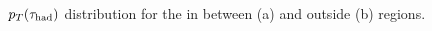 \begin{figure}[ht]
	\centering
	\hfill
	\caption{$p_T(\tau_\text{had})$ distribution for the in between (a) and outside (b) regions.}
	\label{Fig12}
\end{figure} 
